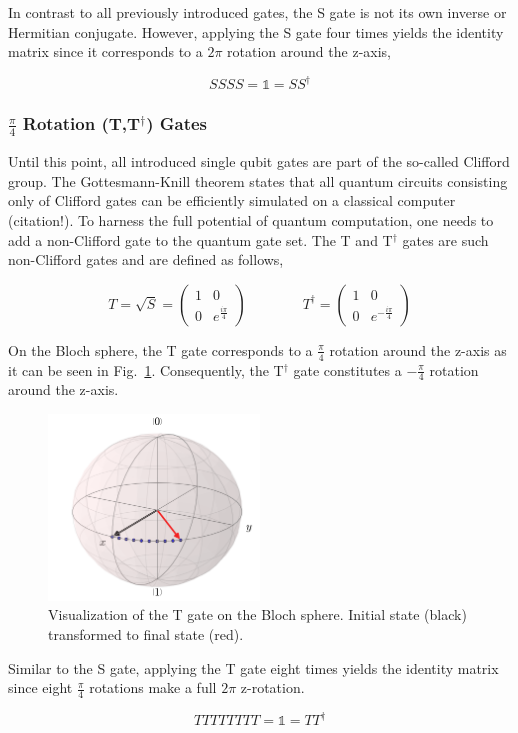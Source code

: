 In contrast to all previously introduced gates, the S gate is not its own inverse or Hermitian conjugate. However, applying the S gate four times yields the identity matrix since it corresponds to a $2\pi$ rotation around the z-axis,

\begin{equation}
SSSS = \mathbb{1} = SS^\dagger
\end{equation}

\subsubsection{$\frac{\pi}{4}$ Rotation (T,T$^\dagger$) Gates}
\label{subsubsubsec:noncliffordgates}

Until this point, all introduced single qubit gates are part of the so-called Clifford group. The Gottesmann-Knill theorem states that all quantum circuits consisting only of Clifford gates can be efficiently simulated on a classical computer (citation!). To harness the full potential of quantum computation, one needs to add a non-Clifford gate to the quantum gate set. The T and T$^\dagger$ gates are such non-Clifford gates and are defined as follows,

\begin{equation}
T = \sqrt{S} = \begin{pmatrix}
 1 & 0 \\ 
 0 & e^{\frac{i\pi}{4}}
 \end{pmatrix}
\quad \quad \quad \quad
T^\dagger = \begin{pmatrix}
 1 & 0 \\ 
 0 & e^{-\frac{i\pi}{4}}
 \end{pmatrix}
\end{equation}

On the Bloch sphere, the T gate corresponds to a $\frac{\pi}{4}$ rotation around the z-axis as it can be seen in Fig.~\ref{img:blochtgate}. Consequently, the T$^\dagger$ gate constitutes a $-\frac{\pi}{4}$ rotation around the z-axis.

\begin{figure}[ht]
   \centering
   \includegraphics[width=0.5\textwidth]{img/blochtgate.png}
   \caption{Visualization of the T gate on the Bloch sphere. Initial state (black) transformed to final state (red).}
   \label{img:blochtgate}
\end{figure}

Similar to the S gate, applying the T gate eight times yields the identity matrix since eight $\frac{\pi}{4}$ rotations make a full $2\pi$ z-rotation.

\begin{equation}
TTTTTTTT = \mathbb{1} = TT^\dagger
\end{equation}
